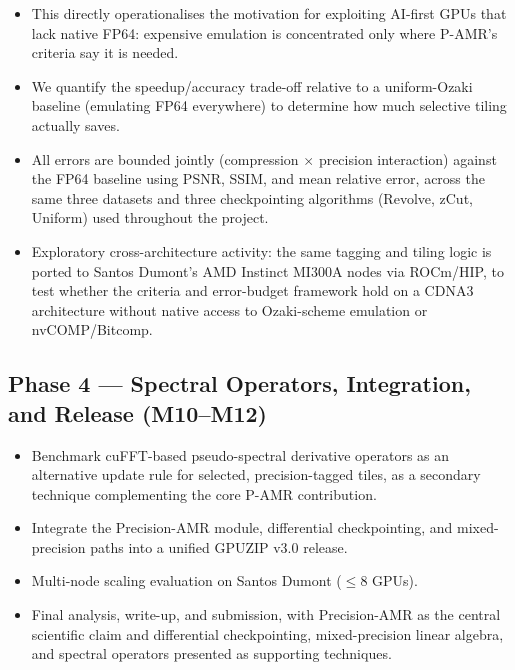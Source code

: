 \documentclass[12pt,a4paper]{article}
\newcommand{\pamr}{P\nobreakdash-AMR}
\begin{document}
\begin{itemize}
  \item This directly operationalises the motivation for exploiting AI-first GPUs
        that lack native FP64: expensive emulation is concentrated only where
        \pamr{}'s criteria say it is needed.
  \item We quantify the speedup/accuracy trade-off relative to a uniform-Ozaki
        baseline (emulating FP64 everywhere) to determine how much selective
        tiling actually saves.
  \item All errors are bounded jointly (compression $\times$ precision
        interaction) against the FP64 baseline using PSNR, SSIM, and mean
        relative error, across the same three datasets and three checkpointing
        algorithms (Revolve, zCut, Uniform) used throughout the project.
  \item Exploratory cross-architecture activity: the same tagging and tiling logic
        is ported to Santos Dumont's AMD Instinct MI300A nodes via ROCm/HIP, to
        test whether the criteria and error-budget framework hold on a CDNA3
        architecture without native access to Ozaki-scheme emulation or
        nvCOMP/Bitcomp.
\end{itemize}

\subsection{Phase 4 --- Spectral Operators, Integration, and Release (M10--M12)}

\begin{itemize}
  \item Benchmark cuFFT-based pseudo-spectral derivative operators as an
        alternative update rule for selected, precision-tagged tiles, as a
        secondary technique complementing the core \pamr{} contribution.
  \item Integrate the Precision-AMR module, differential checkpointing, and
        mixed-precision paths into a unified GPUZIP v3.0 release.
  \item Multi-node scaling evaluation on Santos Dumont ($\leq$8 GPUs).
  \item Final analysis, write-up, and submission, with Precision-AMR as the
        central scientific claim and differential checkpointing, mixed-precision
        linear algebra, and spectral operators presented as supporting
        techniques.
\end{itemize}
\end{document}
